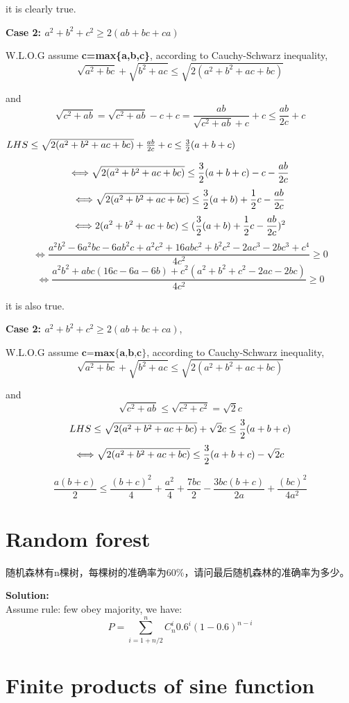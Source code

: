 \documentclass[11pt,a4paper]{article}
\begin{document}
it is clearly true.

\textbf{Case 2: $a^2+b^2+c^2 \geq 2(ab+bc+ca)$}

W.L.O.G assume \textbf{c=max\{a,b,c\}},
according to Cauchy-Schwarz inequality, $$\sqrt{a^2+bc} + \sqrt{b^2+ac} \leq \sqrt{2(a^2+b^2+ac+bc)}$$

and $$\sqrt{c^2+ab}=\sqrt{c^2+ab}-c+c=\frac{ab}{\sqrt{c^2+ab}+c} +c \leq \frac{ab}{2c} +c$$

$LHS \leq \sqrt{2(a^2+b^2+ac+bc)} + \frac{ab}{2c} +c \leq {3\over2}(a+b+c)$

$$\Longleftrightarrow \sqrt{2(a^2+b^2+ac+bc)} \leq {3\over2}(a+b+c) - c - \frac{ab}{2c}$$
$$\Longleftrightarrow \sqrt{2(a^2+b^2+ac+bc)} \leq {3\over2}(a+b) + {1\over2}c - \frac{ab}{2c}$$
$$\Longleftrightarrow 2(a^2+b^2+ac+bc) \leq ({3\over2}(a+b) + {1\over2}c - \frac{ab}{2c})^2$$
$$\Longleftrightarrow \frac{a^2b^2-6a^2bc-6ab^2c+a^2c^2+16abc^2+b^2c^2-2ac^3-2bc^3+c^4}{4c^2} \geq 0$$
$$\Longleftrightarrow \frac{a^2b^2+abc(16c-6a-6b)+c^2(a^2+b^2+c^2-2ac-2bc)}{4c^2} \geq 0$$

it is also true.

\textbf{Case 2: $a^2+b^2+c^2 \geq 2(ab+bc+ca)$}, 

W.L.O.G assume $\textbf{c=max\{a,b,c\}}$, according to Cauchy-Schwarz inequality, $$\sqrt{a^2+bc} + \sqrt{b^2+ac} \leq \sqrt{2(a^2+b^2+ac+bc)}$$

and $$\sqrt{c^2+ab} \leq \sqrt{c^2+c^2} = \sqrt{2}c$$
$$LHS \leq \sqrt{2(a^2+b^2+ac+bc)} + \sqrt{2}c \leq {3\over2}(a+b+c)$$
$$\Longleftrightarrow \sqrt{2(a^2+b^2+ac+bc)} \leq {3\over2}(a+b+c) - \sqrt{2}c$$

$$\frac{a(b+c)}{2} \le \frac{(b+c)^2}{4} +\frac{a^2}{4} + \frac{7bc}{2} - \frac{3bc(b+c)}{2a} + \frac{(bc)^2}{4a^2}
$$

\section{Random forest}
\begin{CJK}{UTF8}{gbsn}
随机森林有n棵树，每棵树的准确率为60\%，请问最后随机森林的准确率为多少。
\end{CJK}
\newline\textbf{Solution:}
\\Assume rule: few obey majority, we have:
$$P = \sum_{i=1+n/2}^{n}C_n^i0.6^i(1-0.6)^{n-i}$$

\section{Finite products of sine function}
\end{document}
